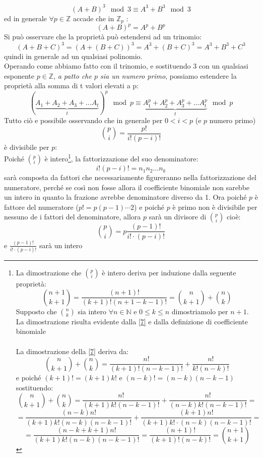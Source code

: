 \documentclass[14pt,a4paper]{article}
\begin{document}
	\begin{equation*}
		(A+B)^3 \mod 3\equiv A^3+B^3 \mod 3
	\end{equation*}
	ed in generale  $\forall p 	\in \mathbb{Z} $ accade che in $ \mathbb{Z}_p $ :
	\[ (A+B)^p=A^p+B^p \]
	Si può osservare che la proprietà può estendersi ad un trinomio:
	\begin{equation*}
		(A+B+C)^3=(A+(B+C))^3=A^3+(B+C)^3=A^3+B^3+C^3
	\end{equation*}
	quindi in generale ad un qualsiasi polinomio.\\
	Operando come abbiamo fatto con il trinomio, e sostituendo 3  con un qualsiasi esponente $ p \in \mathbb{Z} $, \textit{a patto che $ p $ sia un numero primo}, possiamo estendere la proprietà alla somma di t valori  elevati a p:
	\begin{equation}\label{6}
		(\underbrace{A_1+A_2+A_3+ \dots A_t}_t)^p \mod p\equiv \underbrace{A_1^p+A_2^p+A_3^p+\dots A_t^p}_t \mod p
	\end{equation}
	Tutto ciò e possibile osservando che in generale per $ 0<i<p $ (e $ p $ numero primo)
	\begin{equation*}
		\binom{p}{i}=\frac{p!}{i!(p-i)!}
	\end{equation*}
	è divisibile per $ p $:\\
	Poiché $ \binom{p}{i} $ è intero\footnote{\tiny
	La dimostrazione che $ \binom{p}{i} $ è intero deriva per induzione dalla seguente proprietà:
	\begin{equation}
		\binom{n+1}{k+1}=\frac{(n+1)!}{(k+1)! (n+1-k-1)!}=\binom{n}{k+1}+\binom{n}{k} \label{7}
	\end{equation} Supposto che $ \binom{n}{k} $ sia intero $ \forall n \in \mathbb{N} $ e $ 0\leq k\leq n $ dimostriamolo per $ n+1 $.\\
	La dimostrazione risulta evidente dalla \eqref{7} e dalla definizione di coefficiente binomiale\\
	\\
La dimostrazione della \eqref{7} deriva da:\[ \binom{n}{k+1}+\binom{n}{k}=\frac{n!}{(k+1)! (n-k-1)!}+\frac{n!}{k!(n-k)!} \] e poiché $ (k+1)!=(k+1) k! $ e  $ (n-k)!=(n-k) (n-k-1) $ sostituendo: \[ \binom{n}{k+1}+\binom{n}{k}=\frac{n!}{(k+1) k! (n-k-1)!} + \frac{n!}{(n-k) k! (n-k-1)!}= \]\[ =\frac{(n-k) n!}{(k+1) k! (n-k) (n-k-1)!}+\frac{(k+1) n!}{(k+1) k!\cdot (n-k) (n-k-1)!}= \]\[ =\frac{(n-k+k+1)n! }{(k+1) k!(n-k)(n-k-1)!} = \frac{(n+1)!}{(k+1)! (n-k)!} = \binom{n+1}{k+1}\]

}, la fattorizzazione del suo denominatore:\[ i!(p-i)!=n_1  n_2 \dots n_k \] sarà composta da fattori che necessariamente figureranno nella fattorizzazione del numeratore, perché se così non fosse allora il coefficiente binomiale non sarebbe un intero in quanto la frazione avrebbe denominatore diverso da 1. Ora poiché  $ p $ è fattore del numeratore ($ p!=p  (p-1)\cdots 2 $) e poiché $ p $ è primo non è divisibile per nessuno de	i fattori del denominatore, allora $ p $ sarà un divisore di $ \binom{p}{i} $ cioè: \[ \binom{p}{i}=p  \frac{(p-1)!}{i!\cdot(p-i)!} \] e $ \frac{(p-1)!}{i!\cdot(p-i)!} $ sarà un intero
\end{document}
